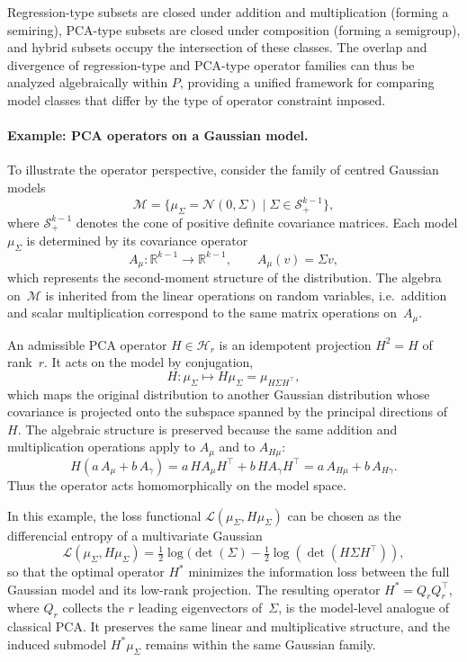 Regression-type subsets are closed under addition and multiplication (forming a semiring), PCA-type subsets are closed under composition (forming a semigroup), and hybrid subsets occupy the intersection of these classes. The overlap and divergence of regression-type and PCA-type operator families can thus be analyzed algebraically within $P$, providing a unified framework for comparing model classes that differ by the type of operator constraint imposed.

\paragraph{Example: PCA operators on a Gaussian model.}

To illustrate the operator perspective, consider the family of centred Gaussian models
\[
    \mathcal{M} = \bigl\{ \mu_\Sigma = \mathcal{N}(0,\Sigma) \;\big|\;
        \Sigma \in \mathcal{S}_{+}^{k-1} \bigr\},
\]
where $\mathcal{S}_{+}^{k-1}$ denotes the cone of positive definite covariance matrices. Each model $\mu_\Sigma$ is determined by its covariance operator
\[
    A_\mu : \mathbb{R}^{k-1} \to \mathbb{R}^{k-1}, \qquad
    A_\mu(v) = \Sigma v,
\]
which represents the second-moment structure of the distribution.  
The algebra on~$\mathcal{M}$ is inherited from the linear operations on random variables, i.e.\
addition and scalar multiplication correspond to the same matrix operations on~$A_\mu$.

An admissible PCA operator $H \in \mathcal{H}_r$ is an idempotent projection $H^2 = H$
of rank~$r$.  
It acts on the model by conjugation,
\[
    H : \mu_\Sigma \longmapsto H\mu_\Sigma = \mu_{H\Sigma H^\top},
\]
which maps the original distribution to another Gaussian distribution
whose covariance is projected onto the subspace spanned by the principal directions of~$H$.  
The algebraic structure is preserved because the same addition and multiplication operations
apply to $A_\mu$ and to $A_{H\mu}$:
\[
    H(a\,A_\mu + b\,A_\gamma)
        = a\,H A_\mu H^\top + b\,H A_\gamma H^\top
        = a\,A_{H\mu} + b\,A_{H\gamma}.
\]
Thus the operator acts homomorphically on the model space.

In this example, the loss functional $\mathcal{L}(\mu_\Sigma,H\mu_\Sigma)$
can be chosen as the differencial entropy of a multivariate Gaussian
\[
    \mathcal{L}(\mu_\Sigma,H\mu_\Sigma)
        = \tfrac{1}{2}\log(\det(\Sigma)
        - \tfrac{1}{2}\log(\det(H\Sigma H^\top)),
\]
so that the optimal operator $H^\ast$
minimizes the information loss between the full Gaussian model and its
low-rank projection.  
The resulting operator $H^\ast = Q_r Q_r^\top$,
where $Q_r$ collects the $r$ leading eigenvectors of~$\Sigma$,
is the model-level analogue of classical PCA. It preserves the same linear and multiplicative structure,
and the induced submodel $H^\ast \mu_\Sigma$ remains within the same Gaussian family.

